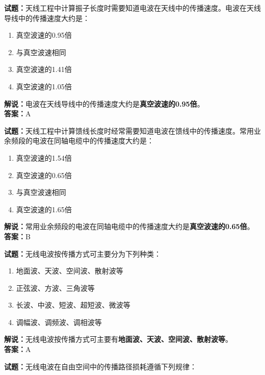 \documentclass{ctexbook}
\begin{document}
\bigskip


\noindent\textbf{试题：}天线工程中计算振子长度时需要知道电波在天线中的传播速度。电波在天线导线中的传播速度大约是：

\begin{enumerate}[leftmargin=3em]
	\item 真空波速的0.95倍
	\item 与真空波速相同
	\item 真空波速的1.41倍
	\item 真空波速的1.05倍
\end{enumerate}

\noindent\textbf{解说：}电波在天线导线中的传播速度大约是\textbf{真空波速的0.95倍}。\\\noindent\textbf{答案：}A


\bigskip


\noindent\textbf{试题：}天线工程中计算馈线长度时经常需要知道电波在馈线中的传播速度。常用业余频段的电波在同轴电缆中的传播速度大约是：

\begin{enumerate}[leftmargin=3em]
	\item 真空波速的1.54倍
	\item 真空波速的0.65倍
	\item 与真空波速相同
	\item 真空波速的1.65倍
\end{enumerate}

\noindent\textbf{解说：}常用业余频段的电波在同轴电缆中的传播速度大约是\textbf{真空波速的0.65倍}。\\\noindent\textbf{答案：}B


\bigskip


\noindent\textbf{试题：}无线电波按传播方式可主要分为下列种类：

\begin{enumerate}[leftmargin=3em]
	\item 地面波、天波、空间波、散射波等
	\item 正弦波、方波、三角波等
	\item 长波、中波、短波、超短波、微波等
	\item 调幅波、调频波、调相波等
\end{enumerate}

\noindent\textbf{解说：}无线电波按传播方式可主要有\textbf{地面波、天波、空间波、散射波等}。\\\noindent\textbf{答案：}A


\bigskip


\noindent\textbf{试题：}无线电波在自由空间中的传播路径损耗遵循下列规律：
\end{document}
